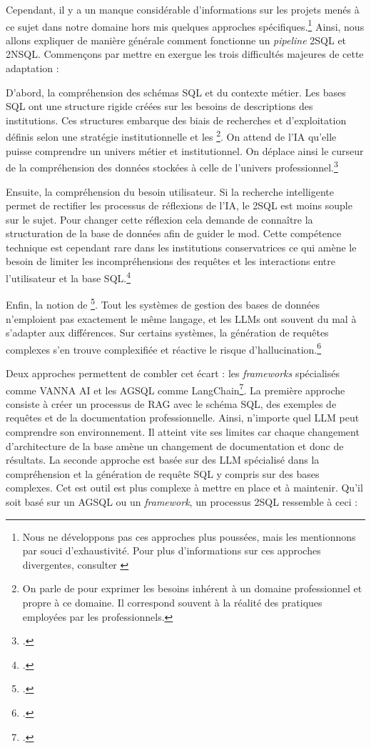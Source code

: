 Cependant, il y a un manque considérable d'informations sur les projets menés à ce sujet dans notre domaine hors mis quelques approches spécifiques.\footnote{Nous ne développons pas ces approches plus poussées, mais les mentionnons par souci d'exhaustivité. Pour plus d'informations sur ces approches divergentes, consulter \cites{sergeevTalkingDataDesigning}{cazzaroQueryingLLMsIf}} Ainsi, nous allons expliquer de manière générale comment fonctionne un \textit{pipeline} \gls{2SQL} et \gls{2NSQL}. Commençons par mettre en exergue les trois difficultés majeures de cette adaptation : \newline 

D'abord, la compréhension des schémas SQL et du contexte métier. Les bases SQL ont une structure rigide créées sur les besoins de descriptions des institutions. Ces structures embarque des biais de recherches et d'exploitation définis selon une stratégie institutionnelle et les \footnote{On parle de  pour exprimer les besoins inhérent à un domaine professionnel et propre à ce domaine. Il correspond souvent à la réalité des pratiques employées par les professionnels.}. On attend de l'\gls{IA} qu'elle puisse comprendre un univers métier et institutionnel. On déplace ainsi le curseur de la compréhension des données stockées à celle de l'univers professionnel.\footcite{CommentObtenirCode}

Ensuite, la compréhension du besoin utilisateur. Si la recherche intelligente permet de rectifier les processus de réflexions de l'\gls{IA}, le \gls{2SQL} est moins souple sur le sujet. Pour changer cette réflexion cela demande de connaître la structuration de la base de données afin de guider le \gls{mod}. Cette compétence technique est cependant rare dans les institutions conservatrices ce qui amène le besoin de limiter les incompréhensions des requêtes et les interactions entre l'utilisateur et la base SQL.\footcite{CommentObtenirCode}

Enfin, la notion de \footcite{CommentObtenirCode}. Tout les systèmes de gestion des bases de données n'emploient pas exactement le même langage, et les \glspl{LLM} ont souvent du mal à s'adapter aux différences. Sur certains systèmes, la génération de requêtes complexes s'en trouve complexifiée et réactive le risque d'hallucination.\footcite{CommentObtenirCode}

Deux approches permettent de combler cet écart : les \textit{frameworks} spécialisés comme VANNA AI et les \gls{AGSQL} comme LangChain\footcite{TexttoSQLInterrogerVos2026}. La première approche consiste à créer un processus de \gls{RAG} avec le schéma SQL, des exemples de requêtes et de la documentation professionnelle. Ainsi, n'importe quel \gls{LLM} peut comprendre son environnement. Il atteint vite ses limites car chaque changement d'architecture de la base amène un changement de documentation et donc de résultats. La seconde approche est basée sur des \gls{LLM} spécialisé dans la compréhension et la génération de requête SQL y compris sur des bases complexes. Cet est outil est plus complexe à mettre en place et à maintenir. Qu'il soit basé sur un \gls{AGSQL} ou un \textit{framework}, un processus \gls{2SQL} ressemble à ceci :


